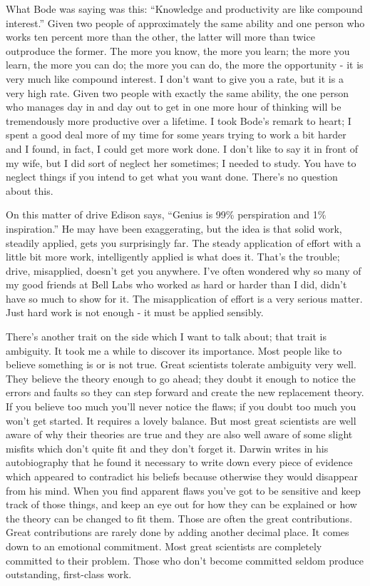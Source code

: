 \documentclass{article}
\begin{document}
What Bode was saying was this: ``Knowledge and productivity are like compound interest.'' Given two people of approximately the same ability and one person who works ten percent more than the other, the latter will more than twice outproduce the former. The more you know, the more you learn; the more you learn, the more you can do; the more you can do, the more the opportunity - it is very much like compound interest. I don't want to give you a rate, but it is a very high rate. Given two people with exactly the same ability, the one person who manages day in and day out to get in one more hour of thinking will be tremendously more productive over a lifetime. I took Bode's remark to heart; I spent a good deal more of my time for some years trying to work a bit harder and I found, in fact, I could get more work done. I don't like to say it in front of my wife, but I did sort of neglect her sometimes; I needed to study. You have to neglect things if you intend to get what you want done. There's no question about this.

On this matter of drive Edison says, ``Genius is 99\% perspiration and 1\% inspiration.'' He may have been exaggerating, but the idea is that solid work, steadily applied, gets you surprisingly far. The steady application of effort with a little bit more work, intelligently applied is what does it. That's the trouble; drive, misapplied, doesn't get you anywhere. I've often wondered why so many of my good friends at Bell Labs who worked as hard or harder than I did, didn't have so much to show for it. The misapplication of effort is a very serious matter. Just hard work is not enough - it must be applied sensibly.

There's another trait on the side which I want to talk about; that trait is ambiguity. It took me a while to discover its importance. Most people like to believe something is or is not true. Great scientists tolerate ambiguity very well. They believe the theory enough to go ahead; they doubt it enough to notice the errors and faults so they can step forward and create the new replacement theory. If you believe too much you'll never notice the flaws; if you doubt too much you won't get started. It requires a lovely balance. But most great scientists are well aware of why their theories are true and they are also well aware of some slight misfits which don't quite fit and they don't forget it. Darwin writes in his autobiography that he found it necessary to write down every piece of evidence which appeared to contradict his beliefs because otherwise they would disappear from his mind. When you find apparent flaws you've got to be sensitive and keep track of those things, and keep an eye out for how they can be explained or how the theory can be changed to fit them. Those are often the great contributions. Great contributions are rarely done by adding another decimal place. It comes down to an emotional commitment. Most great scientists are completely committed to their problem. Those who don't become committed seldom produce outstanding, first-class work.
\end{document}
